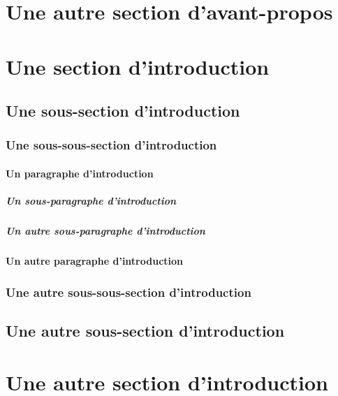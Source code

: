 \documentclass{yathesis}
\begin{document}
\section{Une autre section d'avant-propos}
\lipsum[30-35]
%
\tableofcontents[depth=chapter,name=Sommaire]
%
\listoftables
%
\listoffigures
%
%
%
\begin{introduction*}
\lipsum[26-27]
\section{Une section d'introduction}
\lipsum[28-29]
\subsection{Une sous-section d'introduction}
\lipsum[29-31]
\subsubsection{Une sous-sous-section d'introduction}
\lipsum[31-35]
\paragraph{Un paragraphe d'introduction}
\lipsum[36-38]
\subparagraph{Un sous-paragraphe d'introduction}
\lipsum[39-41]
\subparagraph{Un autre sous-paragraphe d'introduction}
\lipsum[39-41]
\paragraph{Un autre paragraphe d'introduction}
\lipsum[36-38]
\subsubsection{Une autre sous-sous-section d'introduction}
\lipsum[31-37]
\subsection{Une autre sous-section d'introduction}
\lipsum[29-31]
\section{Une autre section d'introduction}
\lipsum[28-43]
\end{introduction*}
%
%
\end{document}
